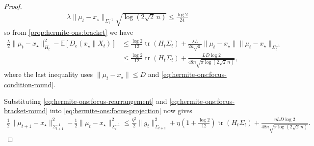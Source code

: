\documentclass{article}
\theoremstyle{plain}
\theoremstyle{definition}
\theoremstyle{plain}
\newcommand{\tr}{\operatorname{tr}}
\newcommand{\E}{\mathbb E}
\begin{document}
\begin{proof}
    \begin{align}
        \lambda
        \|\mu_t-x_\star\|_{\Sigma_t^{-1}}
        \sqrt{\log(2\sqrt2\,n)}
        \leq
        \frac{\log2}{24}
        \label{eq:hermite-ons:focus-condition-round}
    \end{align}
    so from \cref{prop:hermite-ons:bracket} we have
    \begin{align}
        \frac{\lambda}{2}
        \|\mu_t-x_\star\|_{H_t}^2
        -
        \E[D_e(x_\star\|X_t)]
         & \leq
        \frac{\log2}{12}\tr(H_t\Sigma_t)
        +
        \frac{\lambda L}{2n\sqrt\pi}
        \|\mu_t-x_\star\|
        \|\mu_t-x_\star\|_{\Sigma_t^{-1}}
        \\
         & \leq
        \frac{\log2}{12}\tr(H_t\Sigma_t)
        +
        \frac{LD\log2}
        {48n\sqrt{\pi\log(2\sqrt2\,n)}},
        \label{eq:hermite-ons:focus-bracket-round}
    \end{align}
    where the last inequality uses $\|\mu_t-x_\star\|\leq D$ and
    \eqref{eq:hermite-ons:focus-condition-round}.

    Substituting
    \eqref{eq:hermite-ons:focus-rearrangement} and
    \eqref{eq:hermite-ons:focus-bracket-round} into
    \eqref{eq:hermite-ons:focus-projection} now gives
    \begin{align}
        \frac12
        \|\mu_{t+1}-x_\star\|_{\Sigma_{t+1}^{-1}}^2
        -
        \frac12
        \|\mu_t-x_\star\|_{\Sigma_t^{-1}}^2
        \leq
        \frac{\eta^2}{2}
        \|g_t\|_{\Sigma_{t+1}}^2
        +
        \eta\left(1+\frac{\log2}{12}\right)
        \tr(H_t\Sigma_t)
        +
        \frac{\eta LD\log2}
        {48n\sqrt{\pi\log(2\sqrt2\,n)}}.
        \label{eq:hermite-ons:focus-recursion}
    \end{align}


\end{proof}
\end{document}
